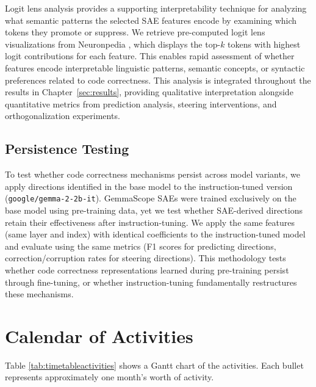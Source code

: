 Logit lens analysis \cite{nostalgebraist2020logit} provides a supporting interpretability technique for analyzing what semantic patterns the selected SAE features encode by examining which tokens they promote or suppress. We retrieve pre-computed logit lens visualizations from Neuronpedia \cite{neuronpedia}, which displays the top-$k$ tokens with highest logit contributions for each feature. This enables rapid assessment of whether features encode interpretable linguistic patterns, semantic concepts, or syntactic preferences related to code correctness. This analysis is integrated throughout the results in Chapter~\ref{sec:results}, providing qualitative interpretation alongside quantitative metrics from prediction analysis, steering interventions, and orthogonalization experiments.

\subsection{Persistence Testing}
\label{sec:persistence-testing}

To test whether code correctness mechanisms persist across model variants, we apply directions identified in the base model to the instruction-tuned version (\texttt{google/gemma-2-2b-it}). GemmaScope SAEs were trained exclusively on the base model using pre-training data, yet we test whether SAE-derived directions retain their effectiveness after instruction-tuning. We apply the same features (same layer and index) with identical coefficients to the instruction-tuned model and evaluate using the same metrics (F1 scores for predicting directions, correction/corruption rates for steering directions). This methodology tests whether code correctness representations learned during pre-training persist through fine-tuning, or whether instruction-tuning fundamentally restructures these mechanisms.

\section{Calendar of Activities}

Table \ref{tab:timetableactivities} shows a Gantt chart of the activities. Each bullet represents approximately one month's worth of activity.

